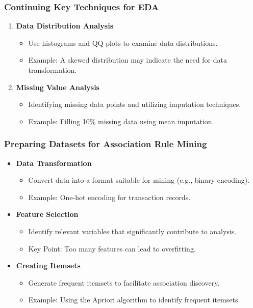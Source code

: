 \documentclass{beamer}
\begin{document}
\begin{frame}
    \frametitle{Continuing Key Techniques for EDA}
    \begin{enumerate}[start=4]
        \item \textbf{Data Distribution Analysis}
        \begin{itemize}
            \item Use histograms and QQ plots to examine data distributions.
            \item Example: A skewed distribution may indicate the need for data transformation.
        \end{itemize}
        
        \item \textbf{Missing Value Analysis}
        \begin{itemize}
            \item Identifying missing data points and utilizing imputation techniques.
            \item Example: Filling 10\% missing data using mean imputation.
        \end{itemize}
    \end{enumerate}
\end{frame}

\begin{frame}
    \frametitle{Preparing Datasets for Association Rule Mining}
    \begin{itemize}
        \item \textbf{Data Transformation}
        \begin{itemize}
            \item Convert data into a format suitable for mining (e.g., binary encoding).
            \item Example: One-hot encoding for transaction records.
        \end{itemize}
        
        \item \textbf{Feature Selection}
        \begin{itemize}
            \item Identify relevant variables that significantly contribute to analysis.
            \item Key Point: Too many features can lead to overfitting.
        \end{itemize}
        
        \item \textbf{Creating Itemsets}
        \begin{itemize}
            \item Generate frequent itemsets to facilitate association discovery.
            \item Example: Using the Apriori algorithm to identify frequent itemsets.
        \end{itemize}
    \end{itemize}
\end{frame}
\end{document}
